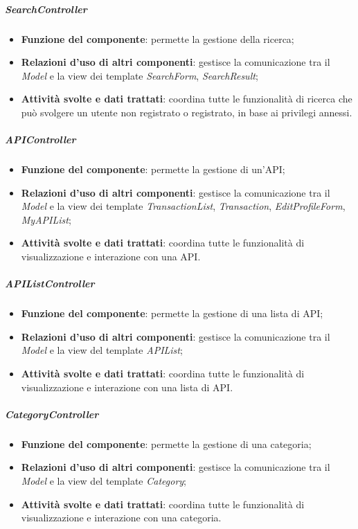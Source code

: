 \subparagraph{SearchController}
\begin{itemize}
	\item \textbf{Funzione del componente}: permette la gestione della ricerca;
	\item \textbf{Relazioni d'uso di altri componenti}: gestisce la comunicazione tra il \textit{Model} e la view dei template \textit{SearchForm}, \textit{SearchResult};
	\item \textbf{Attività svolte e dati trattati}: coordina tutte le funzionalità di ricerca che può svolgere un utente non registrato o registrato, in base ai privilegi annessi.
\end{itemize}

\subparagraph{APIController}
\begin{itemize}
	\item \textbf{Funzione del componente}: permette la gestione di un'API;
	\item \textbf{Relazioni d'uso di altri componenti}: gestisce la comunicazione tra il \textit{Model} e la view dei template \textit{TransactionList}, \textit{Transaction}, \textit{EditProfileForm}, \textit{MyAPIList};
	\item \textbf{Attività svolte e dati trattati}: coordina tutte le funzionalità di visualizzazione e interazione con una API.
\end{itemize}

\subparagraph{APIListController}
\begin{itemize}
	\item \textbf{Funzione del componente}: permette la gestione di una lista di API;
	\item \textbf{Relazioni d'uso di altri componenti}: gestisce la comunicazione tra il \textit{Model} e la view del template \textit{APIList};
	\item \textbf{Attività svolte e dati trattati}: coordina tutte le funzionalità di visualizzazione e interazione con una lista di API.
\end{itemize}

\subparagraph{CategoryController}
\begin{itemize}
	\item \textbf{Funzione del componente}: permette la gestione di una categoria;
	\item \textbf{Relazioni d'uso di altri componenti}: gestisce la comunicazione tra il \textit{Model} e la view del template \textit{Category};
	\item \textbf{Attività svolte e dati trattati}: coordina tutte le funzionalità di visualizzazione e interazione con una categoria.
\end{itemize}

